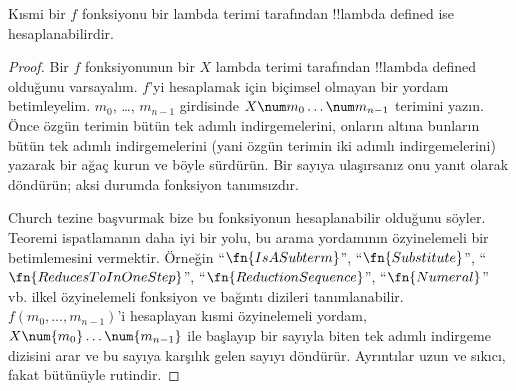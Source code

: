 


\begin{thm}
Kısmi bir $f$ fonksiyonu bir lambda terimi tarafından !!{lambda defined}
ise hesaplanabilirdir.
\end{thm}

\begin{proof}
Bir $f$ fonksiyonunun bir $X$ lambda terimi tarafından !!{lambda defined}
olduğunu varsayalım. $f$'yi hesaplamak için biçimsel olmayan bir yordam
betimleyelim. $m_0$, \dots, $m_{n-1}$ girdisinde
$X\num m_0\ldots\num m_{n-1}$ terimini yazın. Önce özgün terimin bütün tek
adımlı indirgemelerini, onların altına bunların bütün tek adımlı
indirgemelerini (yani özgün terimin iki adımlı indirgemelerini) yazarak bir
ağaç kurun ve böyle sürdürün. Bir sayıya ulaşırsanız onu yanıt olarak
döndürün; aksi durumda fonksiyon tanımsızdır.

Church tezine başvurmak bize bu fonksiyonun hesaplanabilir olduğunu söyler.
Teoremi ispatlamanın daha iyi bir yolu, bu arama yordamının özyinelemeli bir
betimlemesini vermektir. Örneğin ``$\fn{IsASubterm}$'',
``$\fn{Substitute}$'', ``$\fn{ReducesToInOneStep}$'',
``$\fn{ReductionSequence}$'', ``$\fn{Numeral}$'' vb. ilkel özyinelemeli
fonksiyon ve bağıntı dizileri tanımlanabilir. $f(m_0,\dots,m_{n-1})$'i
hesaplayan kısmi özyinelemeli yordam, $X\num{m_0}\dots\num{m_{n-1}}$ ile
başlayıp bir sayıyla biten tek adımlı indirgeme dizisini arar ve bu sayıya
karşılık gelen sayıyı döndürür. Ayrıntılar uzun ve sıkıcı, fakat bütünüyle
rutindir.
\end{proof}

